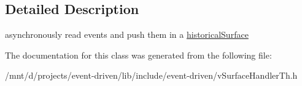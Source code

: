 \subsection{Detailed Description}
asynchronously read events and push them in a \hyperlink{classev_1_1historicalSurface}{historical\+Surface} 

The documentation for this class was generated from the following file\+:\begin{DoxyCompactItemize}
\item 
/mnt/d/projects/event-\/driven/lib/include/event-\/driven/v\+Surface\+Handler\+Th.\+h\end{DoxyCompactItemize}
